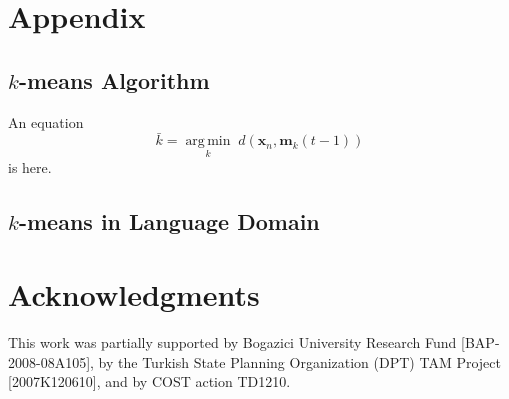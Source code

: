 \documentclass[pre,twocolumn,showkeys,longbibliography]{revtex4-1}
\newcommand{\argmin}[2]{\underset{#1}{\operatorname{arg \, min}}\;#2}
\theoremstyle{plain}%
\theoremstyle{definition}
\theoremstyle{remark}
\begin{document}
\appendix
\newcommand{\hbAppendixPrefix}{A}
%
\renewcommand{\thefigure}{\hbAppendixPrefix\arabic{figure}}
\setcounter{figure}{0}
\renewcommand{\thetable}{\hbAppendixPrefix\arabic{table}} 
\setcounter{table}{0}
\renewcommand{\theequation}{\hbAppendixPrefix\arabic{equation}} 
\setcounter{equation}{0}

\section{Appendix}
\label{sec:appendix}




\subsection{$k$-means Algorithm}
	\label{sec:kMeansAlgorithm}

An equation
\begin{equation}
	\label{eq:kBar}
	\bar{k} = \argmin{k} d(\mathbf{x}_{n},  \mathbf{m}_{k}(t-1))
\end{equation}
is here.





\subsection{$k$-means in Language Domain}







\section*{Acknowledgments}

This work was partially supported 
by Bogazici University Research Fund [BAP-2008-08A105], 
by the Turkish State Planning Organization (DPT) TAM Project [2007K120610], 
and 
by COST action TD1210.










\listofchanges   %
\end{document}
